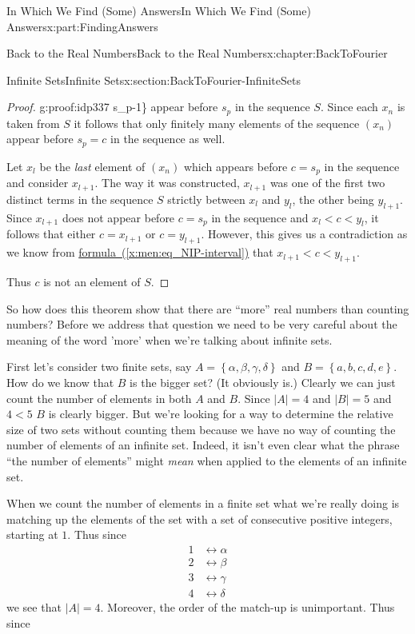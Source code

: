 \documentclass[oneside,10pt,]{book}
\newcommand{\xreffont}{\relax}
\numberwithin{equation}{section}
\newcommand{\abs}[1]{\left|#1\right|}
\newcommand{\lt}{<}
\newcommand{\amp}{&}
\begin{document}
\begin{partptx}{In Which We Find (Some) Answers}{}{In Which We Find (Some) Answers}{}{}{x:part:FindingAnswers}
\begin{chapterptx}{Back to the Real Numbers}{}{Back to the Real Numbers}{}{}{x:chapter:BackToFourier}
\begin{sectionptx}{Infinite Sets}{}{Infinite Sets}{}{}{x:section:BackToFourier-InfiniteSets}
\begin{proof}{}{g:proof:idp337}
s_{p-1}\right\}\) appear before \(s_p\) in the sequence \(S\). Since each \(x_n\) is taken from \(S\) it follows that only finitely many elements of the sequence \((x_n)\) appear before \(s_p=c\) in the sequence as well.%
\par
Let \(x_l\) be the \emph{last} element of \((x_n)\) which appears before \(c=s_p\) in the sequence and consider \(x_{l+1}\). The way it was constructed, \(x_{l+1}\) was one of the first two distinct terms in the sequence \(S\) strictly between \(x_l\) and \(y_l\), the other being \(y_{l+1}\). Since \(x_{l+1}\) does not appear before \(c=s_p\) in the sequence and \(x_l\lt c\lt y_l\), it follows that either \(c=x_{l+1}\) or \(c=y_{l+1}\). However, this gives us a contradiction as we know from \hyperref[x:men:eq_NIP-interval]{formula~({\xreffont\ref{x:men:eq_NIP-interval}})} that \(x_{l+1}\lt c\lt y_{l+1}\).%
\par
Thus \(c\) is not an element of \(S\).%
\end{proof}
So how does this theorem show that there are ``more'' real numbers than counting numbers? Before we address that question we need to be very careful about the meaning of the word 'more' when we're talking about infinite sets.%
\par
First let's consider two finite sets, say \(A=\left\{\alpha,\beta,\gamma,\delta\right\}\) and \(B=\left\{a,b,c,d,e\right\}\). How do we know that \(B\) is the bigger set? (It obviously is.) Clearly we can just count the number of elements in both \(A\) and \(B\). Since \(\abs{A}=4\) and \(\abs{B}=5\) and \(4\lt 5\) \(B\) is clearly bigger. But we're looking for a way to determine the relative size of two sets without counting them because we have no way of counting the number of elements of an infinite set. Indeed, it isn't even clear what the phrase ``the number of elements'' might \emph{mean} when applied to the elements of an infinite set.%
\par
When we count the number of elements in a finite set what we're really doing is matching up the elements of the set with a set of consecutive positive integers, starting at \(1\). Thus since%
\begin{align*}
1\amp \leftrightarrow\alpha\\
2\amp \leftrightarrow\beta\\
3\amp \leftrightarrow\gamma\\
4\amp \leftrightarrow\delta
\end{align*}
we see that \(\abs{A}=4\). Moreover, the order of the match-up is unimportant. Thus since%

\end{sectionptx}
\end{chapterptx}
\end{partptx}
\end{document}
